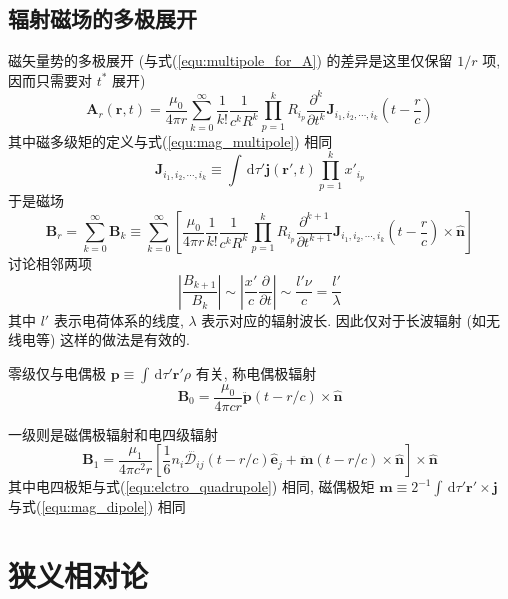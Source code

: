 \documentclass[12pt,a4paper]{article}%
\numberwithin{equation}{section}%
\renewcommand*{\vec}[1]{\bm{#1}}%
\newcommand{\dif}{\,\mathrm d}
\newcommand*{\uvec}[1]{\hat{\vec{#1}}}
\begin{document}
\subsection{辐射磁场的多极展开} %
\label{sub:radiation_field_multipole}
磁矢量势的多极展开 (与式(\ref{equ:multipole_for_A}) 的差异是这里仅保留 $1/r$ 项, 因而只需要对 $t^*$ 展开)
\begin{equation}
    \vec A_r (\vec r,t) = \frac{\mu_0}{4\pi r}\sum_{k=0}^{\infty}
    \frac 1{k!}\frac 1{c^k R^k} \prod_{p=1}^k R_{i_p}\frac{\partial^k}{\partial t^k} 
    \vec J_{i_1, i_2, \cdots, i_k}\left(t - \frac rc\right)
\end{equation}
其中磁多级矩的定义与式(\ref{equ:mag_multipole}) 相同
\begin{equation}
    \vec J_{i_1, i_2, \cdots, i_k}\equiv\int\dif \tau'\vec j(\vec r', t)\prod_{p=1}^k x'_{i_p}
\end{equation}
于是磁场
\begin{equation}
    \vec B_r = \sum_{k=0}^\infty \vec B_k \equiv \sum_{k=0}^\infty \left[
    \frac{\mu_0}{4\pi r}\frac 1{k!}\frac 1{c^k R^k} \prod_{p=1}^k R_{i_p}\frac{\partial^{k+1}}{\partial t^{k+1}} \vec J_{i_1, i_2, \cdots, i_k}\left(t - \frac rc\right)\times\uvec n\right]
\end{equation}
讨论相邻两项
\begin{equation}
    \left|\frac{B_{k+1}}{B_k}\right| \sim \left|\frac{x'}{c}\frac{\partial}{\partial t}\right|\sim\frac{l'\nu}{c} = \frac{l'}{\lambda}
\end{equation}
其中 $l'$ 表示电荷体系的线度, $\lambda$ 表示对应的辐射波长. 因此仅对于长波辐射 (如无线电等) 这样的做法是有效的.

零级仅与电偶极 $\vec p \equiv \int\dif \tau'\vec r'\rho$ 有关, 称电偶极辐射
\begin{equation}
    \vec B_0 = \frac{\mu_0}{4\pi cr}\ddot{\vec p}(t-r/c)\times\uvec n
\end{equation}

一级则是磁偶极辐射和电四级辐射
\begin{equation}
    \vec B_1 = \frac{\mu_1}{4\pi c^2 r}\left[\frac 16 n_i\dddot{\mathscr D_{ij}}(t-r/c) \uvec e_j + \ddot{\vec m}(t-r/c)\times\uvec n\right]\times\uvec n
\end{equation}
其中电四极矩与式(\ref{equ:elctro_quadrupole}) 相同, 磁偶极矩 $\vec m \equiv 2^{-1}\int\dif \tau'\vec r'\times\vec j$ 与式(\ref{equ:mag_dipole}) 相同

\section{狭义相对论} %
\label{sec:special_relativity}
\end{document}
